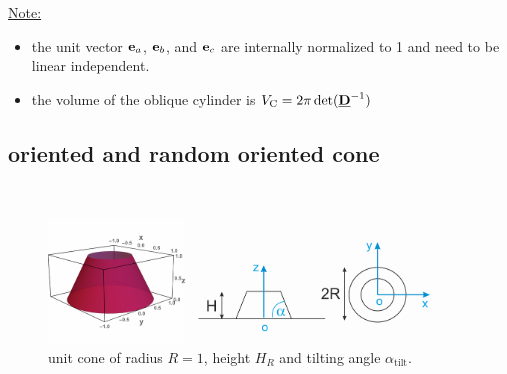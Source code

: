 \noindent\underline{Note:}
\begin{itemize}
\item the unit vector $\B{e}_a$, $\B{e}_b$, and $\B{e}_c$ are internally normalized to 1 and need to be linear independent.
\item the volume of the oblique cylinder is $V_\mathrm{C}=2\pi\det(\M{D}^{-1})$
\end{itemize}

\subsection{oriented and random oriented cone} ~\\

\begin{figure}[htb]
\begin{center}
\includegraphics[width=0.9\textwidth]{../images/form_factor/oriented_primitive_opbjects/cone.png}
\end{center}
\caption{unit cone of radius $R=1$, height $H_R$ and  tilting angle $\alpha_\mathrm{tilt}$.}
\label{fig:opo_cone}
\end{figure}

